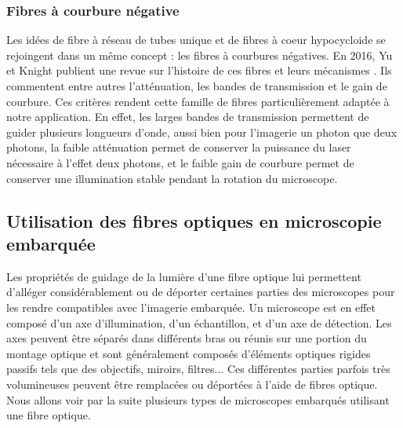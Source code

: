 \subsubsection{Fibres à courbure négative}

Les idées de fibre à réseau de tubes unique et de fibres à coeur hypocycloide se rejoingent dans un même concept : les fibres à courbures négatives. En 2016, Yu et Knight publient une revue sur l'histoire de ces fibres et leurs mécanismes \cite{yu_negative_2016}. Ils commentent entre autres l'atténuation, les bandes de transmission et le gain de courbure. Ces critères rendent cette famille de fibres particulièrement adaptée à notre application. En effet, les larges bandes de transmission permettent de guider plusieurs longueurs d'onde, aussi bien pour l'imagerie un photon que deux photons, la faible atténuation permet de conserver la puissance du laser nécessaire à l'effet deux photons, et le faible gain de courbure permet de conserver une illumination stable pendant la rotation du microscope.



\subsection{Utilisation des fibres optiques en microscopie embarquée}


Les propriétés de guidage de la lumière d'une fibre optique lui permettent d'alléger considérablement ou de déporter certaines parties des microscopes pour les rendre compatibles avec l'imagerie embarquée. Un microscope est en effet composé d'un axe d'illumination, d'un échantillon, et d'un axe de détection. Les axes peuvent être séparés dans différents bras ou réunis sur une portion du montage optique et sont généralement composés d'éléments optiques rigides passifs tels que des objectifs, miroirs, filtres... Ces différentes parties parfois très volumineuses peuvent être remplacées ou déportées à l'aide de fibres optique. Nous allons voir par la suite plusieurs types de microscopes embarqués utilisant une fibre optique.

